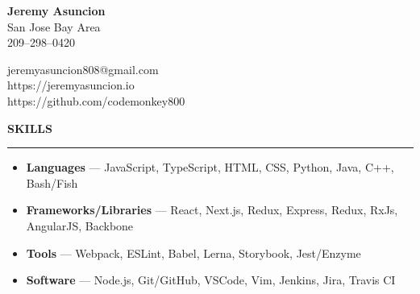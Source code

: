 \documentclass[10pt, oneside]{letter}
\newcommand{\linespaceshit} {
  \vspace{0.05in}
  \hrule
  \vspace{0.05in}
}
\begin{document}
  \begin{minipage}[t]{11cm}
    \flushleft
    \textbf{Jeremy Asuncion} \\
    San Jose Bay Area \\
    209--298--0420 \\

  \end{minipage}
  \begin{minipage}[t]{7cm}
    \flushright
    jeremyasuncion808@gmail.com \\
    https://jeremyasuncion.io \\
    https://github.com/codemonkey800
  \end{minipage}

  \vspace{0.1in}

  \textbf{SKILLS}
  \linespaceshit
  \begin{adjustwidth}{0.1in}{0pt}
    \begin{itemize}
      \setlength\itemsep{0.05in}
      \item{\textbf{Languages}} --- JavaScript, TypeScript, HTML, CSS, Python, Java, C++, Bash/Fish
      \item{\textbf{Frameworks/Libraries}} --- React, Next.js, Redux, Express, Redux, RxJs, AngularJS, Backbone
      \item{\textbf{Tools}} --- Webpack, ESLint, Babel, Lerna, Storybook, Jest/Enzyme
      \item{\textbf{Software}} --- Node.js, Git/GitHub, VSCode, Vim, Jenkins, Jira, Travis CI
    \end{itemize}
  \end{adjustwidth}
\end{document}
